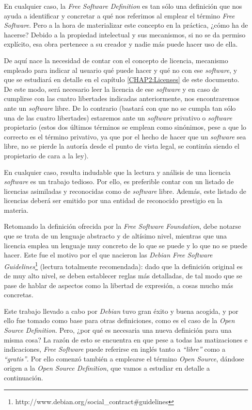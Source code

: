 En cualquier caso, la \textit{Free Software Definition} es tan sólo una
definición que nos ayuda a identificar y concretar a qué nos referimos al
emplear el término \textit{Free Software}. Pero a la hora de materializar este
concepto en la práctica, ¿cómo ha de hacerse? Debido a la propiedad intelectual
y sus mecanismos, si no se da permiso explícito, esa obra pertenece a su creador
y nadie más puede hacer uso de ella.

De aquí nace la necesidad de contar con el concepto de licencia, mecanismo
empleado para indicar al usuario qué puede hacer y qué no con ese
\textit{software}, y que se estudiará en detalle en el capítulo
\ref{CHAP2:Licenses} de este documento. De este modo, será necesario
leer la licencia de ese \textit{software} y en caso de cumplirse con las cuatro
libertades indicadas anteriormente, nos encontraremos ante un \textit{software}
libre. De lo contrario (bastará con que no se cumpla tan sólo una de las cuatro
libertades) estaremos ante un \textit{software} privativo o \textit{software}
propietario (estos dos últimos términos se emplean como sinónimos, pese a que lo
correcto es el término privativo, ya que por el hecho de hacer que un
\textit{software} sea libre, no se pierde la autoría desde el punto de vista
legal, se continúa siendo el propietario de cara a la ley).

En cualquier caso, resulta indudable que la lectura y análisis de una licencia
\textit{software} es un trabajo tedioso. Por ello, es preferible contar con un
listado de licencias asimiladas y reconocidas como de \textit{software} libre.
Además, este listado de licencias deberá ser emitido por una entidad de
reconocido prestigio en la materia.

Retomando la definición ofrecida por la \textit{Free Software Foundation}, debe
notarse que se trata de un lenguaje abstracto y de altísimo nivel, mientras que
una licencia emplea un lenguaje muy concreto de lo que se puede y lo que no se
puede hacer. Este fue el motivo por el que nacieron las \textit{Debian Free
Software Guidelines}\footnote{http://www.debian.org/social_contract#guidelines}
(lectura totalmente recomendada): dado que la definición original es de muy alto
nivel, se deben establecer reglas más detalladas, de tal modo que se pase de
hablar de aspectos como la libertad de expresión, a cosas mucho más concretas.

Este trabajo llevado a cabo por \textit{Debian} tuvo gran éxito y buena acogida,
y por ello fue tomado como base para otras definiciones, como es el caso de
la \textit{Open Source Definition}. Pero, ¿por qué es necesaria una nueva
definición para una misma cosa? La razón de esto se encuentra en que pese a
todas las matizaciones e indicaciones, \textit{Free Software} puede referirse en
inglés tanto a \textit{``libre''} como a \textit{``gratis''}. Por ello comenzó
también a emplearse el término \textit{Open Source}, dándose origen a la
\textit{Open Source Definition}, que vamos a estudiar en detalle a continuación.


